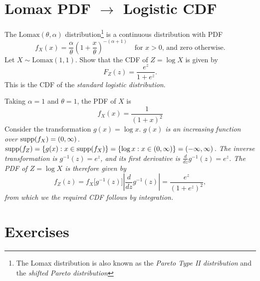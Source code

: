 \section{Lomax PDF $\longrightarrow$ Logistic CDF}


\begin{example}
The $\text{Lomax}(\theta,\alpha)$ distribution\footnote{The Lomax distribution is also known as the \emph{Pareto Type II distribution} and the \emph{shifted Pareto distribution}} is a continuous distribution with PDF
\[
f_X(x) = \frac{\alpha}{\theta}\left(1+\frac{x}{\theta}\right)^{-(\alpha+1)}	\quad\text{for $x > 0$, and zero otherwise.}
\]
Let $X\sim\text{Lomax}(1,1)$. Show that the CDF of $Z = \log X$ is given by
\[
F_Z(z) =  \frac{e^z}{1+e^z}.
\]
This is the CDF of the \emph{standard logistic distribution}.
\end{example}
\begin{solution}
Taking $\alpha=1$ and $\theta=1$, the PDF of $X$ is 
\[
f_X(x) = \frac{1}{(1 + x)^2}
\]
Consider the transformation $g(x) = \log x$.
\bit
\it $g(x)$ is an increasing function over $\text{supp}(f_X)=(0,\infty)$.
\it $\text{supp}(f_Z) = \{g(x):x\in\text{supp}(f_X)\} = \{\log x: x\in(0,\infty)\} = (-\infty,\infty)$.
\it The inverse transformation is  $g^{-1}(z) = e^z$, and its first derivative is $\displaystyle\frac{d}{dz}g^{-1}(z) = e^z$.
\eit
The PDF of $Z = \log X$ is therefore given by
\[
f_Z(z) = f_X\big[g^{-1}(z)\big]\left|\frac{d}{dz}g^{-1}(z)\right| = \frac{e^z}{(1+e^z)^2},
\]
from which we the required CDF follows by integration.
\end{solution}

\section{Exercises}


\endinput
